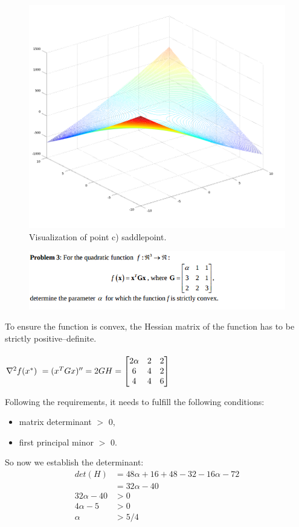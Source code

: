 \documentclass[eng,openany]{mgr}
\begin{document}
\begin{figure}[h]
\centering
\includegraphics[width=0.7\linewidth]{screenshot010}
\caption{Visualization of point c) saddlepoint.}
\label{fig:screenshot010}
\end{figure}

\clearpage
\begin{figure}[h]
\centering
\includegraphics[width=0.7\linewidth]{screenshot011}
\label{fig:screenshot011}
\end{figure}

To ensure the function is convex, the Hessian matrix of the function
has to be strictly positive--definite.
\\
\\
\begin{math}
\nabla^2 f(x^*)\ = (x^TGx)'' = 2G\\
\\
H = 
\begin{bmatrix}
2\alpha & 2 & 2\\
6& 4& 2\\
4& 4& 6\\
\end{bmatrix}
\end{math}

Following the requirements, it needs to fulfill the following conditions:
\begin{itemize}
	\item matrix determinant $>$ 0,
	\item first principal minor $>$ 0.
\end{itemize}
So now we establish the determinant:\\
\begin{align*}
det(H) &= 48\alpha + 16 + 48 - 32 - 16\alpha - 72\\
 &= 32 \alpha - 40
 \\
 32\alpha -40 &> 0\\
 4\alpha -5 &> 0\\
 \alpha &> 5/4
\end{align*}
\end{document}

